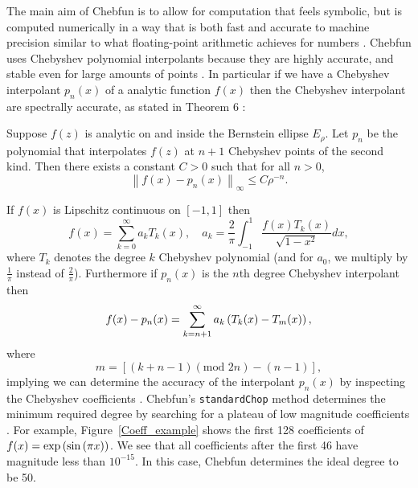 The main aim of Chebfun is to allow for computation that feels symbolic, but is computed numerically in a way that is both fast and accurate to machine precision similar to what floating-point arithmetic achieves for numbers \cite{trefethen2015computing}. Chebfun uses Chebyshev polynomial interpolants because they are highly accurate, and stable even for large amounts of points \cite{mason2002chebyshev,Trefethen2013}.  In particular if we have a Chebyshev interpolant $p_n(x)$ of a analytic function $f(x)$ then the Chebyshev interpolant are spectrally accurate, as stated in Theorem 6 \cite{trefethen2000spectral}:
\begin{thm} Suppose $f(z)$ is analytic on and inside the Bernstein ellipse $E_\rho$. Let $p_n$ be the polynomial that interpolates $f(z)$ at $n+1$ Chebyshev points of the second kind. Then there exists a constant $C>0$ such that for all $n>0$,
	$$ \left \| f(x)-p_n(x) \right \|_{\infty} \leq C  \rho^{-n}.$$
\end{thm}
If $f(x)$ is Lipschitz continuous on $[-1,1]$ then
\begin{equation}
f(x) = \sum_{k=0}^\infty a_k T_k(x), \quad a_k = \frac{2}{\pi} \int_{-1}^1 \frac{f(x) T_k(x)}{\sqrt{1-x^2}} dx,
\end{equation}
where $T_k$ denotes the degree $k$ Chebyshev polynomial (and for $a_0$, we multiply by $\frac{1}{\pi}$ instead of $\frac{2}{\pi}$). Furthermore if $p_n(x)$ is the $n$th degree Chebyshev interpolant then
\begin{equation}
f(x)-p_n(x) = \sum_{k=n+1}^{\infty} a_k \left( T_k(x)-T_m(x)\right),
\end{equation}
where
\begin{equation}
m = \left [ (k+n-1)(\text{mod }2n) - (n-1)\right ],
\end{equation}
implying we can determine the accuracy of the interpolant $p_n(x)$ by inspecting the Chebyshev coefficients \cite{Trefethen2013}. Chebfun's {\tt standardChop} method determines the minimum required degree by searching for a plateau of low magnitude coefficients \cite{Aurentz:2017:CCS:3034774.2998442}.  For example, Figure~\ref{Coeff_example} shows the first 128 coefficients of $f(x)=\exp \left( \sin \left( \pi x \right) \right)$. We see that all coefficients after the first 46 have magnitude less than $10^{-15}$. In this case, Chebfun determines the ideal degree to be 50.
